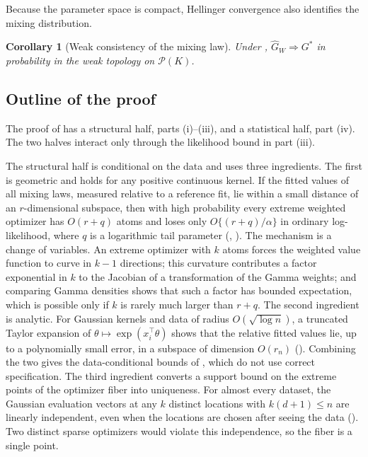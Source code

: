 \documentclass[11pt]{article}
\newtheorem{corollary}{Corollary}
\theoremstyle{definition}
\theoremstyle{remark}
\newcommand{\Pcal}{\mathcal P}
\newcommand{\Ghat}{\widehat G}
\begin{document}
Because the parameter space is compact, Hellinger convergence also
identifies the mixing distribution.

\begin{corollary}[Weak consistency of the mixing law]
\label{cor:weak}
Under , $\Ghat_W\Rightarrow G^*$ in probability in the weak
topology on $\Pcal(K)$.
\end{corollary}

\subsection{Outline of the proof}\label{sec:outline}

The proof of  has a structural half, parts (i)--(iii), and a
statistical half, part (iv).  The two halves interact only through the
likelihood bound in part (iii).

The structural half is conditional on the data and uses three ingredients.
The first is geometric and holds for any positive continuous kernel.  If the
fitted values of all mixing laws, measured relative to a reference fit, lie
within a small distance of an $r$-dimensional subspace, then with high
probability every extreme weighted optimizer has $O(r+q)$ atoms and loses
only $O\{(r+q)/\alpha\}$ in ordinary log-likelihood, where $q$ is a
logarithmic tail parameter (, ).  The
mechanism is a change of variables.  An extreme optimizer with $k$ atoms
forces the weighted value function to curve in $k-1$ directions; this
curvature contributes a factor exponential in $k$ to the Jacobian of a
transformation of the Gamma weights; and comparing Gamma densities shows
that such a factor has bounded expectation, which is possible only if $k$ is
rarely much larger than $r+q$.  The second ingredient is analytic.  For Gaussian
kernels and data of radius $O(\sqrt{\log n})$, a truncated Taylor expansion
of $\theta\mapsto\exp(x_i^\top\theta)$ shows that the relative fitted
values lie, up to a polynomially small error, in a subspace of dimension
$O(r_n)$ ().  Combining the two gives the
data-conditional bounds of , which do not use correct
specification.  The third ingredient converts a support bound on the
extreme points of the optimizer fiber into uniqueness.  For almost every
dataset, the Gaussian evaluation vectors at any $k$ distinct locations with
$k(d+1)\le n$ are linearly independent, even when the locations are chosen
after seeing the data ().  Two distinct sparse optimizers
would violate this independence, so the fiber is a single point.
\end{document}
